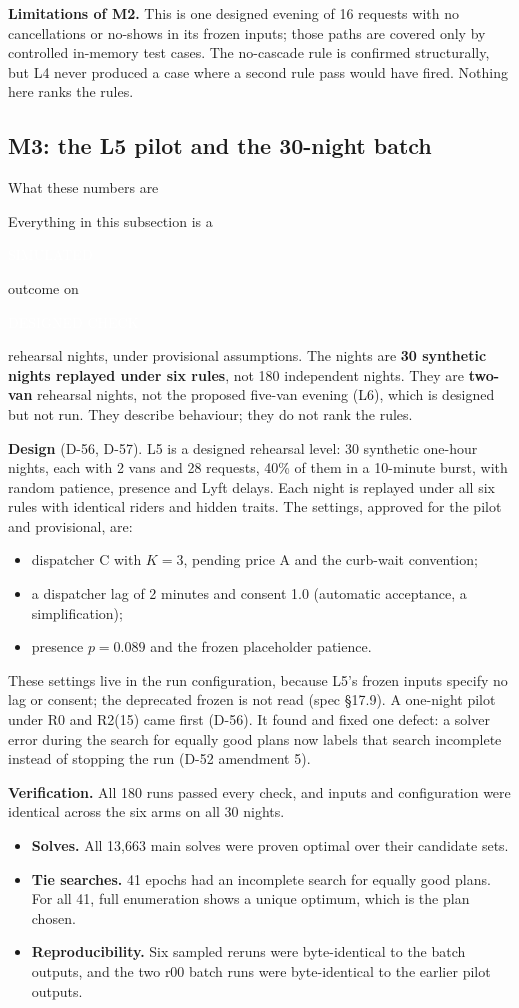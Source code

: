 \documentclass[11pt,letterpaper]{article}
\newcommand{\marker}[2]{{\setlength{\fboxsep}{1.4pt}\colorbox{#1}{\textcolor{white}{\sffamily\bfseries\scriptsize\strut #2}}}}
\newcommand{\Designed}{\marker{cDesigned}{DESIGNED CHECK}}
\newcommand{\Simulated}{\marker{cSim}{SIMULATED}}
\DeclareRobustCommand{\fn}[1]{\texttt{\detokenize{#1}}}
\newcommand{\D}[1]{D-#1}
\newenvironment{callout}[1][]{%
  \def\FrameCommand{\fboxsep=8pt\colorbox{shade}}%
  \MakeFramed{\advance\hsize-\width\FrameRestore}%
  \ifx\relax#1\relax\else{\sffamily\bfseries\color{heading}#1}\par\smallskip\fi}%
  {\endMakeFramed}
\begin{document}
\textbf{Limitations of M2.} This is one designed evening of 16 requests with no cancellations or no-shows in its frozen inputs; those paths are covered only by controlled in-memory test cases. The no-cascade rule is confirmed structurally, but L4 never produced a case where a second rule pass would have fired. Nothing here ranks the rules.

\subsection{M3: the L5 pilot and the 30-night batch}\label{sec:l5}
\begin{callout}[What these numbers are]
Everything in this subsection is a \Simulated{} outcome on \Designed{} rehearsal nights, under provisional assumptions. The nights are \textbf{30 synthetic nights replayed under six rules}, not 180 independent nights. They are \textbf{two-van} rehearsal nights, not the proposed five-van evening (L6), which is designed but not run. They describe behaviour; they do not rank the rules.
\end{callout}

\textbf{Design} (\D{56}, \D{57}). L5 is a designed rehearsal level: 30 synthetic one-hour nights, each with 2 vans and 28 requests, 40\% of them in a 10-minute burst, with random patience, presence and Lyft delays. Each night is replayed under all six rules with identical riders and hidden traits. The settings, approved for the pilot and provisional, are:
\begin{itemize}
\item dispatcher C with $K = 3$, pending price A and the curb-wait convention;
\item a dispatcher lag of 2 minutes and consent 1.0 (automatic acceptance, a simplification);
\item presence $p = 0.089$ and the frozen placeholder patience.
\end{itemize}
These settings live in the run configuration, because L5's frozen inputs specify no lag or consent; the deprecated frozen \fn{p_noshow} is not read (spec §17.9). A one-night pilot under R0 and R2(15) came first (\D{56}). It found and fixed one defect: a solver error during the search for equally good plans now labels that search incomplete instead of stopping the run (\D{52} amendment 5).

\textbf{Verification.} All 180 runs passed every check, and inputs and configuration were identical across the six arms on all 30 nights.
\begin{itemize}
\item \textbf{Solves.} All 13,663 main solves were proven optimal over their candidate sets.
\item \textbf{Tie searches.} 41 epochs had an incomplete search for equally good plans. For all 41, full enumeration shows a unique optimum, which is the plan chosen.
\item \textbf{Reproducibility.} Six sampled reruns were byte-identical to the batch outputs, and the two r00 batch runs were byte-identical to the earlier pilot outputs.
\end{itemize}
\end{document}
